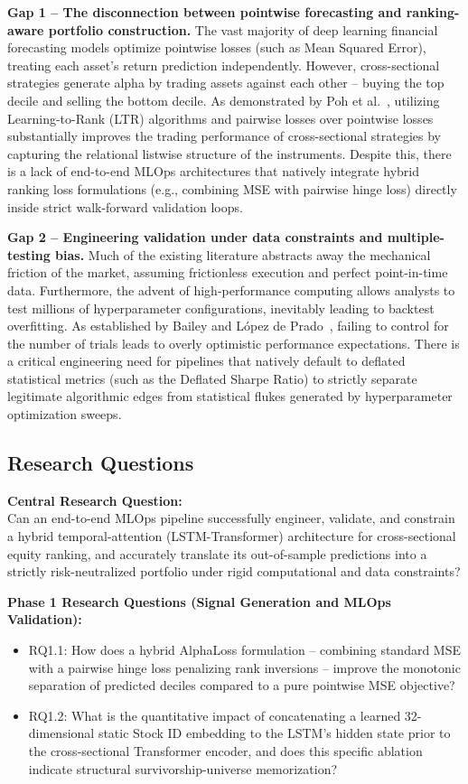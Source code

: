 \documentclass[twoside,final]{hcmut-report}
\begin{document}
\textbf{Gap 1 -- The disconnection between pointwise forecasting and ranking-aware portfolio construction.} The vast majority of deep learning financial forecasting models optimize pointwise losses (such as Mean Squared Error), treating each asset's return prediction independently. However, cross-sectional strategies generate alpha by trading assets against each other -- buying the top decile and selling the bottom decile. As demonstrated by Poh et al.~\cite{Poh2020}, utilizing Learning-to-Rank (LTR) algorithms and pairwise losses over pointwise losses substantially improves the trading performance of cross-sectional strategies by capturing the relational listwise structure of the instruments. Despite this, there is a lack of end-to-end MLOps architectures that natively integrate hybrid ranking loss formulations (e.g., combining MSE with pairwise hinge loss) directly inside strict walk-forward validation loops.

\textbf{Gap 2 -- Engineering validation under data constraints and multiple-testing bias.} Much of the existing literature abstracts away the mechanical friction of the market, assuming frictionless execution and perfect point-in-time data. Furthermore, the advent of high-performance computing allows analysts to test millions of hyperparameter configurations, inevitably leading to backtest overfitting. As established by Bailey and L\'opez de Prado~\cite{BaileyLopezdePrado2014}, failing to control for the number of trials leads to overly optimistic performance expectations. There is a critical engineering need for pipelines that natively default to deflated statistical metrics (such as the Deflated Sharpe Ratio) to strictly separate legitimate algorithmic edges from statistical flukes generated by hyperparameter optimization sweeps.

\subsection{Research Questions}

\textbf{Central Research Question:}\\
Can an end-to-end MLOps pipeline successfully engineer, validate, and constrain a hybrid temporal-attention (LSTM-Transformer) architecture for cross-sectional equity ranking, and accurately translate its out-of-sample predictions into a strictly risk-neutralized portfolio under rigid computational and data constraints?

\textbf{Phase 1 Research Questions (Signal Generation and MLOps Validation):}
\begin{itemize}
    \item RQ1.1: How does a hybrid AlphaLoss formulation -- combining standard MSE with a pairwise hinge loss penalizing rank inversions -- improve the monotonic separation of predicted deciles compared to a pure pointwise MSE objective?
    \item RQ1.2: What is the quantitative impact of concatenating a learned 32-dimensional static Stock ID embedding to the LSTM's hidden state prior to the cross-sectional Transformer encoder, and does this specific ablation indicate structural survivorship-universe memorization?
\end{itemize}
\end{document}

